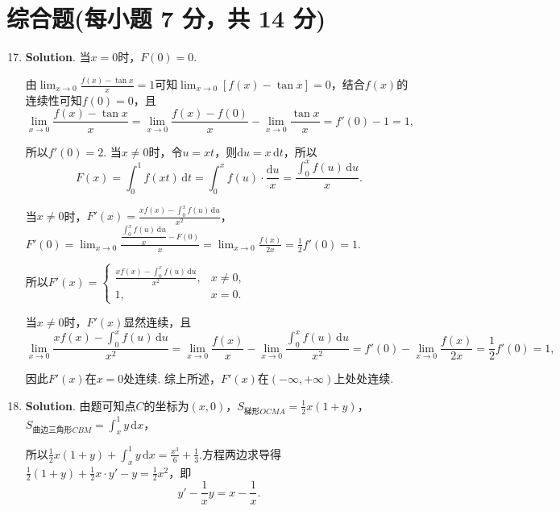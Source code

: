 \documentclass[../Main.tex]{subfiles}
\begin{document}
\section{综合题(每小题 7 分，共 14 分)}
\begin{enumerate}
    \setcounter{enumi}{16}
    \item \textbf{Solution}. 当$x=0$时，$F(0)=0$.

          由$\lim_{x\to0}\frac{f(x)-\tan x}{x}=1$可知$\lim_{x\to 0}[f(x)-\tan x] = 0$，结合$f
              (x)$的连续性可知$f(0)=0$，且
          \[
              \lim_{x\to 0}\frac{f(x)-\tan x}{x}=\lim_{x\to0}\frac{f(x)-f(0)}{x}-\lim_{x\to0}
              \frac{\tan x}{x}=f'(0)-1=1,
          \]

          所以$f'(0)=2$. 当$x\neq 0$时，令$u=xt$，则$\mathrm{d}u=x\,\mathrm{d}t$，所以
          \[
              F(x)=\int_{0}^{1}f(xt)\,\mathrm{d}t=\int_{0}^{x}f(u)\cdot\frac{\mathrm{d}u}{x}
              =\frac{\displaystyle\int_{0}^{x}f(u)\,\mathrm{d}u}{x}.
          \]

          当$x\neq 0$时，$F'(x)=\frac{xf(x)-\displaystyle\int_{0}^{x}f(u)\,\mathrm{d}u}{x^{2}}$，$F
              '(0)=\lim_{x\to 0}\frac{\dfrac{\displaystyle\int_{0}^{x}f(u)\,\mathrm{d}u}{x}-F(0)}{x}
              =\lim_{x\to0}\frac{f(x)}{2x}=\frac{1}{2}f'(0)=1$.

          所以$F'(x)=
              \begin{cases}
                  \frac{xf(x)-\displaystyle\int_{0}^{x}f(u)\,\mathrm{d}u}{x^2}, & x\neq 0, \\
                  1,                                                            & x=0.
              \end{cases}$

          当$x\neq0$时，$F'(x)$显然连续，且
          \[
              \lim_{x\to 0}\frac{xf(x)-\displaystyle\int_{0}^{x}f(u)\,\mathrm{d}u}{x^{2}}
              =\lim_{x\to0}\frac{f(x)}{x}-\lim_{x\to0}\frac{\displaystyle\int_{0}^{x}f(u)\,\mathrm{d}u}{x^{2}}
              =f'(0)-\lim_{x\to0}\frac{f(x)}{2x}=\frac{1}{2}f'(0)=1,
          \]

          因此$F'(x)$在$x=0$处连续. 综上所述，$F'(x)$在$(-\infty,+\infty)$上处处连续.

    \item \textbf{Solution}. 由题可知点$C$的坐标为$(x,0)$，$S_{\text{梯形}OCMA}
              =\frac{1}{2}x(1+y)$，$S_{\text{曲边三角形}CBM}=\int_{x}^{1}y\,\mathrm{d}x$，

          所以$\frac{1}{2}x(1+y)+\int_{x}^{1}y\,\mathrm{d}x=\frac{x^{3}}{6}+\frac{1}{3}$.方程两边求导得$\frac{1}{2}
              (1+y)+\frac{1}{2}x\cdot y'-y=\frac{1}{2}x^{2}$，即
          \[
              y'-\frac{1}{x}y=x-\frac{1}{x}.
          \]


\end{enumerate}
\end{document}
